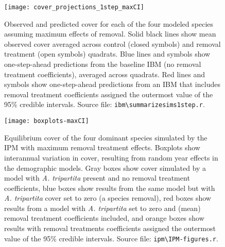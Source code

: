 \documentclass[11pt]{article}
\begin{document}
 \begin{figure}[tbp]
 \centering
 \texttt{[image: cover\_projections\_1step\_maxCI]}
 \caption{Observed and predicted cover for each of the four modeled species assuming maximum effects of removal. 
  Solid black lines show mean observed cover averaged across control (closed symbols) and removal treatment (open symbols) quadrats. Blue lines and symbols show one-step-ahead predictions from the baseline IBM (no removal treatment coefficients), averaged across quadrats. Red lines and symbols show one-step-ahead predictions from an IBM that includes removal treatment coefficients assigned the outermost value of the 95\% credible intervals. 
  Source file: \texttt{ibm\textbackslash summarize\textunderscore sims1step.r}. }
 \label{fig:IBM1step-maxCI}
 \end{figure}
 
  \begin{figure}[tbp]
  \centering
  \texttt{[image: boxplots-maxCI]}
  \caption{Equilibrium cover of the four dominant species simulated by the IPM with maximum removal treatment effects. Boxplots show interannual variation in cover, 
  resulting from random year effects in the demographic models. Gray boxes show cover simulated by a model with \textit{A. tripartita} present and no removal treatment 
  coefficients, blue boxes show results from the same model but with \textit{A. tripartita} cover set to zero (a species removal), red boxes show results from a 
  model with  \textit{A. tripartita} set to zero and (mean) removal treatment coefficients included, and orange boxes show results with removal treatments 
  coefficients assigned the outermost value of the 95\% credible intervals.  Source file: \texttt{ipm\textbackslash IPM-figures.r}.}
  \label{fig:IPMresults-maxCI}
  \end{figure}
\end{document}
